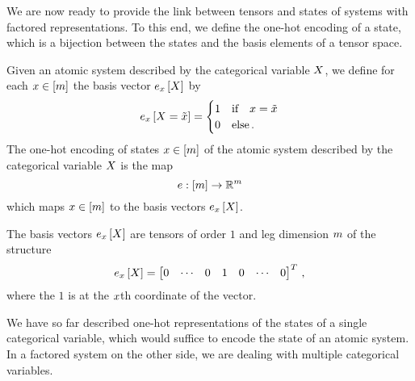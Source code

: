 
We are now ready to provide the link between tensors and states of systems with factored representations.
To this end, we define the one-hot encoding of a state, which is a bijection between the states and the basis elements of a tensor space.

\begin{definition}
	Given an atomic system described by the categorical variable $X$, we define for each $x\in[m]$ the basis vector $e_{x}\left[X\right]$ by
	\begin{align}
		e_{x}\left[X=\tilde{x}\right] = \begin{cases}
			1 & \text{if} \quad x=\tilde{x} \\
			0 & \text{else} \, .
		\end{cases}
	\end{align}
	The one-hot encoding of states $x\in[m]$ of the atomic system described by the categorical variable $X$ is the map
		\[ e: [m] \rightarrow \mathbb{R}^m \]
	which maps $x \in [m]$ to the basis vectors $e_{x}\left[X\right]$.
\end{definition}

The basis vectors $e_{x}\left[X\right]$ are tensors of order $1$ and leg dimension $m$ of the structure
\begin{align}
	e_{x}\left[X\right] = \begin{bmatrix}
	0 & \cdots & 0 & 1 & 0 & \cdots & 0
	\end{bmatrix}^T \, ,
\end{align}
where the $1$ is at the $x$th coordinate of the vector.

We have so far described one-hot representations of the states of a single categorical variable, which would suffice to encode the state of an atomic system.
In a factored system on the other side, we are dealing with multiple categorical variables.

